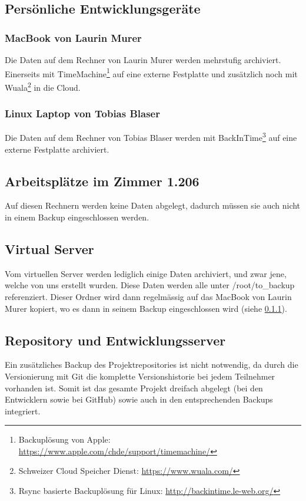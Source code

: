 		\subsection{Persönliche Entwicklungsgeräte}
			\subsubsection{MacBook von Laurin Murer}\label{backupLaurin}
				Die Daten auf dem Rechner von Laurin Murer werden mehrstufig archiviert.
				Einerseits mit TimeMachine\footnote{Backuplösung von Apple: \url{https://www.apple.com/chde/support/timemachine/}} auf eine externe Festplatte und zusätzlich noch mit Wuala\footnote{Schweizer Cloud Speicher Dienst: \url{https://www.wuala.com/}} in die Cloud.

			\subsubsection{Linux Laptop von Tobias Blaser}
				Die Daten auf dem Rechner von Tobias Blaser werden mit BackInTime\footnote{Rsync basierte Backuplösung für Linux: \url{http://backintime.le-web.org/}} auf eine externe Festplatte archiviert.
				
		\subsection{Arbeitsplätze im Zimmer 1.206}
			Auf diesen Rechnern werden keine Daten abgelegt, dadurch müssen sie auch nicht in einem Backup eingeschlossen werden.

		\subsection{Virtual Server}
			Vom virtuellen Server werden lediglich einige Daten archiviert, und zwar jene, welche von uns erstellt wurden.
			Diese Daten werden alle unter /root/to\_backup referenziert.
			Dieser Ordner wird dann regelmässig auf das MacBook von Laurin Murer kopiert, wo es dann in seinem Backup eingeschlossen wird (siehe \ref{backupLaurin}).
		
		\subsection{Repository und Entwicklungsserver}
			Ein zusätzliches Backup des Projektrepositories ist nicht notwendig, da durch die Versionierung mit Git die komplette Versionshistorie bei jedem Teilnehmer vorhanden ist.
			Somit ist das gesamte Projekt dreifach abgelegt (bei den Entwicklern sowie bei GitHub) sowie auch in den entsprechenden Backups integriert.

